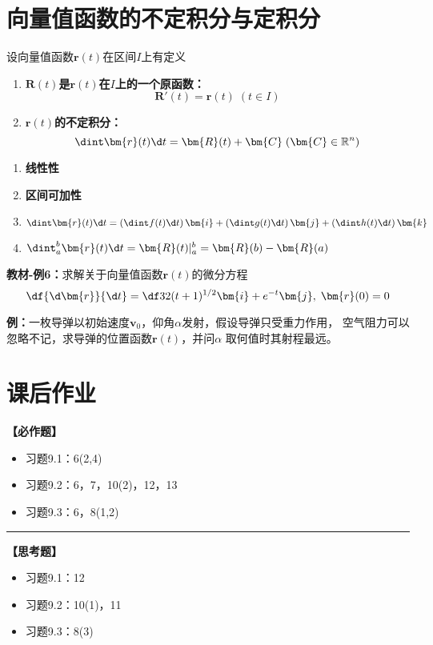 \section{向量值函数的不定积分与定积分}

设向量值函数$\bm{r}(t)$在区间$I$上有定义 
\begin{enumerate}
  \item {\bf $\bm{R}(t)$是$\bm{r}(t)$在$I$上的一个原函数：} 
  $$\bm{R}'(t)=\bm{r}(t)\;(t\in I)$$ 
  \item {\bf $\bm{r}(t)$的不定积分：}
  $$\dint \bm{r}(t)\d t=\bm{R}(t)+\bm{C}\;(\bm{C}\in\mathbb{R}^n)$$
\end{enumerate}

\begin{enumerate}
  \item {\bf 线性性} 
  \item {\bf 区间可加性} 
  \item $\dint\bm{r}(t)\d t=\left(\dint f(t)\d t\right)\bm{i}
  +\left(\dint g(t)\d t\right)\bm{j}+\left(\dint h(t)\d t\right)\bm{k}$ 
  \item $\dint_a^b\bm{r}(t)\d t=\bm{R}(t)|_a^b=\bm{R}(b)-\bm{R}(a)$
\end{enumerate}

{\bf 教材-例6：}求解关于向量值函数$\bm{r}(t)$的微分方程
$$\df{\d\bm{r}}{\d t}=\df 32(t+1)^{1/2}\bm{i}+e^{-t}\bm{j},\;\bm{r}(0)=0$$

{\bf 例：}一枚导弹以初始速度$\bm{v}_0$，仰角$\alpha$发射，假设导弹只受重力作用，
空气阻力可以忽略不记，求导弹的位置函数$\bm{r}(t)$，并问$\alpha$
取何值时其射程最远。

\newpage

\section*{课后作业}

{\bf 【必作题】}

\begin{itemize}
  \setlength{\itemindent}{1cm}
  \item 习题9.1：6(2,4)
  \item 习题9.2：6，7，10(2)，12，13
  \item 习题9.3：6，8(1,2)
\end{itemize}

\bigskip

\hrule

\bigskip

{\bf 【思考题】}

\begin{itemize}
  \setlength{\itemindent}{1cm}
  \item 习题9.1：12
  \item 习题9.2：10(1)，11
  \item 习题9.3：8(3)
\end{itemize}